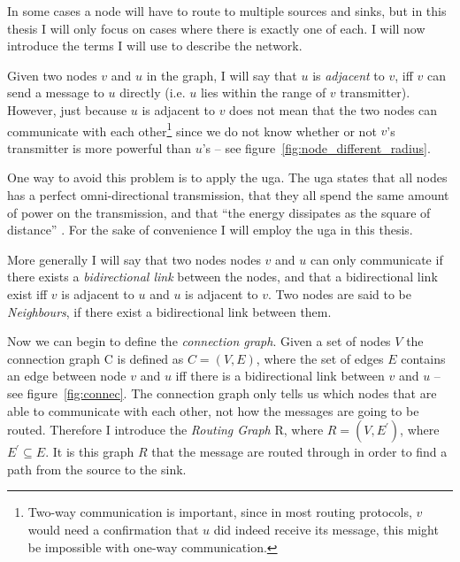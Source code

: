 In some cases a node will have to route to  multiple sources and sinks, but in this thesis I will only focus on cases where there is exactly one of each. I will now introduce the terms I will use to describe the network.


Given two nodes $v$ and $u$ in the graph, I will say that $u$ is \emph{adjacent} to $v$, iff $v$ can send a message to $u$ directly (i.e. $u$ lies within the range of $v$ transmitter). However, just because $u$ is adjacent to $v$ does not mean that the two nodes can communicate with each other\footnote{Two-way communication is important, since in most routing protocols, $v$ would need a confirmation that $u$ did indeed receive its message, this might be impossible with one-way communication.} since we do not know whether or not $v$'s transmitter is more powerful than $u$'s -- see figure~\ref{fig:node_different_radius}. 

One way to avoid this problem is to apply the \ac{uga}. The \ac{uga} states that all nodes has a perfect omni-directional transmission, that they all spend the same amount of power on the transmission, and that ``the energy dissipates as the square of distance'' \cite{practical}. For the sake of convenience I will employ the \ac{uga} in this thesis.\label{section:apply_uga}

More generally I will say that two nodes nodes $v$ and $u$ can only communicate if there exists a \emph{bidirectional link} between the nodes, and that a bidirectional link exist iff $v$ is adjacent to $u$ and $u$ is adjacent to $v$. Two nodes are said to be \emph{Neighbours}, if there exist a bidirectional link between them.

Now we can begin to define the \emph{connection graph}. Given a set of nodes $V$ the connection graph C is defined as $C = (V, E)$, where the set of edges $E$ contains an edge between node $v$ and $u$ iff there is a bidirectional link between $v$ and $u$ -- see figure~\ref{fig:connec}. The connection graph only tells us which nodes that are able to communicate with each other, not how the messages are going to be routed. Therefore I introduce the \emph{Routing Graph} R, where $R = (V, E^{\prime})$, where $E^{\prime} \subseteq E$. It is this graph $R$ that the message are routed through in order to find a path from the source to the sink.

